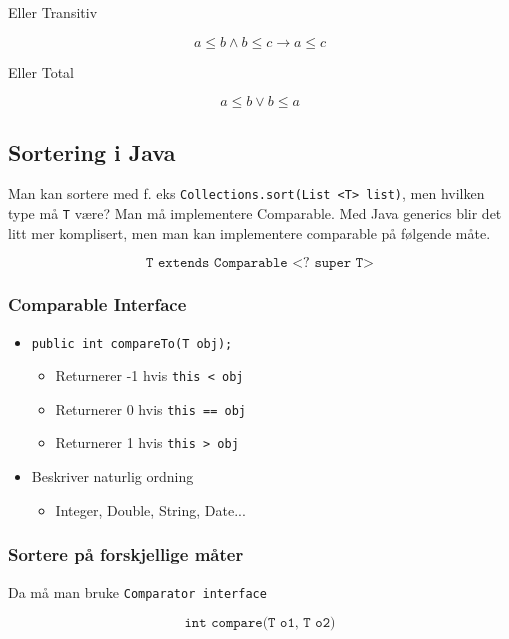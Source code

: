 \documentclass{article}
\begin{document}
    Eller Transitiv

    \[ a \leq b \wedge b \leq c \rightarrow a \leq c  \]

    Eller Total

    \[ a \leq b \vee b \leq a \]

    \subsection{Sortering i Java}

    Man kan sortere med f. eks \texttt{Collections.sort(List <T> list)}, men hvilken type må \texttt{T} være? Man må implementere Comparable. Med Java generics blir det litt mer komplisert, men man kan implementere comparable på følgende måte.

    \[ \texttt{T extends Comparable <? super T>} \]

    \subsubsection{Comparable Interface}

    \begin{itemize}
        \item \texttt{public int compareTo(T obj);}
            \begin{itemize}
                \item Returnerer -1 hvis \texttt{this < obj}
                \item Returnerer 0 hvis \texttt{this == obj}
                \item Returnerer 1 hvis \texttt{this > obj}
            \end{itemize}
        \item Beskriver naturlig ordning
            \begin{itemize}
                \item Integer, Double, String, Date...
            \end{itemize}
    \end{itemize}

    \subsubsection{Sortere på forskjellige måter}
    Da må man bruke \texttt{Comparator interface}

    \[ \texttt{int compare(T o1, T o2)} \]
\end{document}
